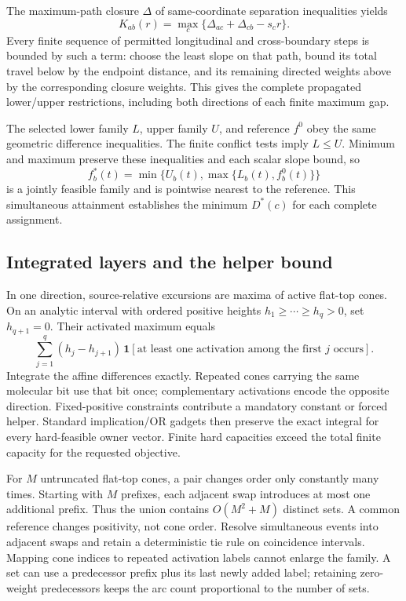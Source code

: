 \documentclass[10pt,letterpaper]{article}
\newcommand{\ind}{\mathbf 1}
\begin{document}
The maximum-path closure $\Delta$ of same-coordinate separation inequalities yields
\[
 K_{ab}(r)=\max_c\{\Delta_{ac}+\Delta_{cb}-s_cr\}.
\]
Every finite sequence of permitted longitudinal and cross-boundary steps is bounded by such a term: choose the least slope on that path, bound its total travel below by the endpoint distance, and its remaining directed weights above by the corresponding closure weights. This gives the complete propagated lower/upper restrictions, including both directions of each finite maximum gap.

The selected lower family $L$, upper family $U$, and reference $f^0$ obey the same geometric difference inequalities. The finite conflict tests imply $L\le U$. Minimum and maximum preserve these inequalities and each scalar slope bound, so
\[
 f_b^*(t)=\min\{U_b(t),\max\{L_b(t),f_b^0(t)\}\}
\]
is a jointly feasible family and is pointwise nearest to the reference. This simultaneous attainment establishes the minimum $D^*(c)$ for each complete assignment.

\FloatBarrier
\subsection{Integrated layers and the helper bound}
In one direction, source-relative excursions are maxima of active flat-top cones. On an analytic interval with ordered positive heights $h_1\ge\cdots\ge h_q>0$, set $h_{q+1}=0$. Their activated maximum equals
\[
 \sum_{j=1}^{q}(h_j-h_{j+1})\,
 \ind[\text{at least one activation among the first }j\text{ occurs}].
\]
Integrate the affine differences exactly. Repeated cones carrying the same molecular bit use that bit once; complementary activations encode the opposite direction. Fixed-positive constraints contribute a mandatory constant or forced helper. Standard implication/OR gadgets then preserve the exact integral for every hard-feasible owner vector. Finite hard capacities exceed the total finite capacity for the requested objective.

For $M$ untruncated flat-top cones, a pair changes order only constantly many times. Starting with $M$ prefixes, each adjacent swap introduces at most one additional prefix. Thus the union contains $O(M^2+M)$ distinct sets. A common reference changes positivity, not cone order. Resolve simultaneous events into adjacent swaps and retain a deterministic tie rule on coincidence intervals. Mapping cone indices to repeated activation labels cannot enlarge the family. A set can use a predecessor prefix plus its last newly added label; retaining zero-weight predecessors keeps the arc count proportional to the number of sets.
\end{document}
